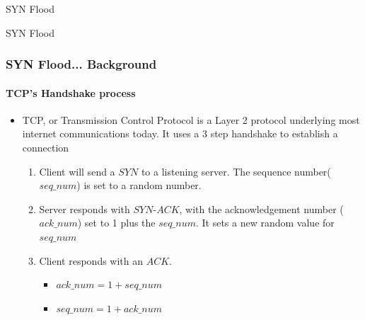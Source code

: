 \documentclass{beamer}
\begin{document}
\begin{frame}{SYN Flood}
	\begin{center}
		\vspace*{\fill}
		{\Large SYN Flood}
		\vspace*{\fill}
	\end{center}
\end{frame}

\begin{frame}
	\frametitle{SYN Flood... Background}
	\framesubtitle{TCP's Handshake process}
	\begin{itemize}
		\item TCP, or Transmission Control Protocol is a Layer 2 protocol underlying
			most internet communications today.  It uses a 3 step handshake to
			establish a connection
			\begin{enumerate}
				\item Client will send a $SYN$ to a listening server.  The sequence
					number($seq\_num$) is set to a random number.
				\item Server responds with $SYN$-$ACK$, with the acknowledgement number
					($ack\_num$) set to 1 plus the $seq\_num$.  It sets a new random value
					for $seq\_num$
				\item Client responds with an $ACK$.
					\begin{itemize}
						\item $ack\_num = 1 + seq\_num$
						\item $seq\_num = 1 + ack\_num$
					\end{itemize}
			\end{enumerate}
	\end{itemize}
\end{frame}
\end{document}
